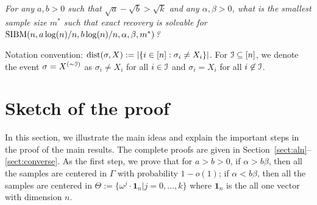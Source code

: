\documentclass{article}
\begin{document}
\vspace*{.1in}
 \emph{For any $a,b> 0$ such that $\sqrt{a}-\sqrt{b}> \sqrt{k}$ and any $\alpha,\beta>0$, what is the smallest sample size $m^\ast$ such that exact recovery is solvable for $\operatorname{SIBM}(n,a\log(n)/n, b\log(n)/n,\alpha,\beta,m^\ast)$?}

Notation convention: $\operatorname{dist}(\sigma, X) := |\{ i \in [n]: \sigma_i \neq X_i\}|$.
For $\mathcal{I} \subseteq [n]$, we denote the event $\sigma = X^{(\sim \mathcal{I})}$ as $\sigma_i \neq X_i$ for all $i \in \mathcal{I}$ and $\sigma_i = X_i$ for all $i \not\in \mathcal{I}$.

\section{Sketch of the proof}
\label{sect:sketch}

In this section, we illustrate the main ideas and explain the important steps in the proof of the main results. The complete proofs are given in Section~\ref{sect:aln}--\ref{sect:converse}.
As the first step, we prove that for $a>b>0$, if $\alpha>b\beta$, then all the samples are centered in $\Gamma$ with probability $1-o(1)$; if $\alpha<b\beta$, then all the samples are centered in $\Theta := \{ \omega^j  \cdot \mathbf{1}_n | j=0, \dots,k\}$ where $\mathbf{1}_n$ is the all one vector with dimension $n$.
\end{document}

